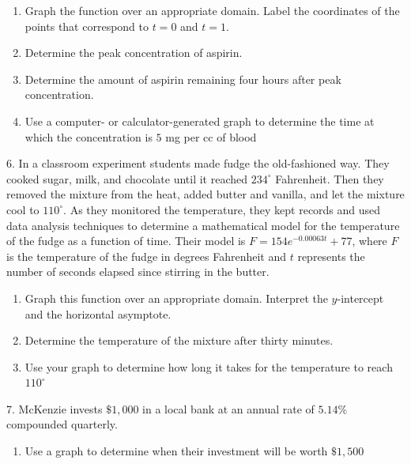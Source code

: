 \documentclass[10pt,]{book}
\theoremstyle{plain}
\theoremstyle{definition}
\theoremstyle{definition}
\theoremstyle{definition}
\numberwithin{equation}{section}
\begin{document}
\begin{exerciselist}
\leavevmode%
\begin{enumerate}[label=(\alph*)]
\item\hypertarget{li-141}{}Graph the function over an appropriate domain. Label the coordinates of the points that correspond to \(t=0\) and \(t=1\).%
\item\hypertarget{li-142}{}Determine the peak concentration of aspirin.%
\item\hypertarget{li-143}{}Determine the amount of aspirin remaining four hours after peak concentration.%
\item\hypertarget{li-144}{}Use a computer- or calculator-generated graph to determine the time at which the concentration is \(5\) mg per cc of blood%
\end{enumerate}
\par\smallskip
\item[6.]\hypertarget{exercise-67}{}\hypertarget{p-263}{}%
In a classroom experiment students made fudge the old-fashioned way.  They cooked sugar, milk, and chocolate until it reached \(234^\circ\) Fahrenheit.  Then they removed the mixture from the heat, added butter and vanilla, and let the mixture cool to \(110^\circ\).  As they monitored the temperature, they kept records and used data analysis techniques to determine a mathematical model for the temperature of the fudge as a function of time.  Their model is \(F = 154e^{-0.00063t} + 77\), where \(F\) is the temperature of the fudge in degrees Fahrenheit and \(t\) represents the number of seconds elapsed since stirring in the butter.%
\leavevmode%
\begin{enumerate}[label=(\alph*)]
\item\hypertarget{li-145}{}Graph this function over an appropriate domain.  Interpret the \(y\)-intercept and the horizontal asymptote.%
\item\hypertarget{li-146}{}Determine the temperature of the mixture after thirty minutes.%
\item\hypertarget{li-147}{}Use your graph to determine how long it takes for the temperature to reach \(110^\circ\)%
\end{enumerate}
\par\smallskip
\item[7.]\hypertarget{exercise-68}{}\hypertarget{p-264}{}%
McKenzie invests \(\$1,000\) in a local bank at an annual rate of \(5.14\%\) compounded quarterly.%
\leavevmode%
\begin{enumerate}[label=(\alph*)]
\item\hypertarget{li-148}{}Use a graph to determine when their investment will be worth \(\$1,500\)%

\end{enumerate}
\end{exerciselist}
\end{document}
